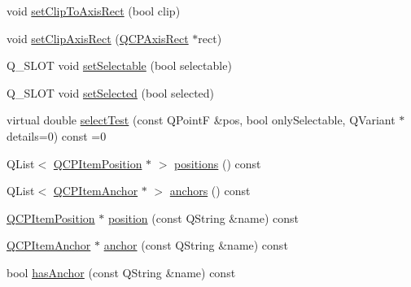 \begin{DoxyCompactItemize}
\item 
void \hyperlink{classQCPAbstractItem_a39e05b9d4176b9accafc746d16ca6a06}{set\-Clip\-To\-Axis\-Rect} (bool clip)
\item 
void \hyperlink{classQCPAbstractItem_a7dc75fcbcd10206fe0b75d757ea7a347}{set\-Clip\-Axis\-Rect} (\hyperlink{classQCPAxisRect}{\-Q\-C\-P\-Axis\-Rect} $\ast$rect)
\item 
\-Q\-\_\-\-S\-L\-O\-T void \hyperlink{classQCPAbstractItem_a8a8e32a55bc478b849756a78c2d87fd2}{set\-Selectable} (bool selectable)
\item 
\-Q\-\_\-\-S\-L\-O\-T void \hyperlink{classQCPAbstractItem_a203de94ad586cc44d16c9565f49d3378}{set\-Selected} (bool selected)
\item 
virtual double \hyperlink{classQCPAbstractItem_a96d522d10ffc0413b9a366c6f7f0476b}{select\-Test} (const \-Q\-Point\-F \&pos, bool only\-Selectable, \-Q\-Variant $\ast$details=0) const =0
\item 
\-Q\-List$<$ \hyperlink{classQCPItemPosition}{\-Q\-C\-P\-Item\-Position} $\ast$ $>$ \hyperlink{classQCPAbstractItem_adf6a680cc29a6bce8345c3b6af3a91a1}{positions} () const 
\item 
\-Q\-List$<$ \hyperlink{classQCPItemAnchor}{\-Q\-C\-P\-Item\-Anchor} $\ast$ $>$ \hyperlink{classQCPAbstractItem_a8454b9941960b840608a5a1e00b1977d}{anchors} () const 
\item 
\hyperlink{classQCPItemPosition}{\-Q\-C\-P\-Item\-Position} $\ast$ \hyperlink{classQCPAbstractItem_af71345bd150f87fa1d2442837b87bb59}{position} (const \-Q\-String \&name) const 
\item 
\hyperlink{classQCPItemAnchor}{\-Q\-C\-P\-Item\-Anchor} $\ast$ \hyperlink{classQCPAbstractItem_abed974cba7cc02608c71dad4638e008d}{anchor} (const \-Q\-String \&name) const 
\item 
bool \hyperlink{classQCPAbstractItem_acbce9e5ba5252541d19db0c40303357a}{has\-Anchor} (const \-Q\-String \&name) const 
\end{DoxyCompactItemize}
